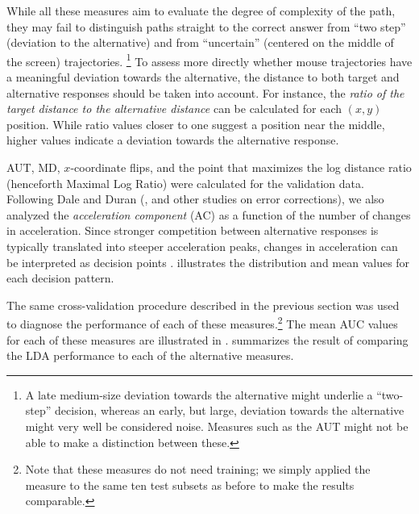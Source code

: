 \documentclass[11pt]{article}
\begin{document}
While all these measures aim to evaluate the degree of complexity of the path, they may fail to distinguish paths straight to the correct answer from ``two step'' (deviation to the alternative) and from ``uncertain'' (centered on the middle of the screen) trajectories.%
%
\footnote{A late medium-size deviation towards the alternative might underlie a ``two-step'' decision, whereas an early, but large, deviation towards the alternative might very well be considered noise. Measures such as the AUT might not be able to make a distinction between these.} 
To assess more directly whether mouse trajectories have a meaningful deviation towards the alternative, the distance to both target and alternative responses should be taken into account. 
For instance, the \textit{ratio of the target distance to the alternative distance} can be calculated for each $(x,y)$ position. While ratio values closer to one suggest a position near the middle, higher values indicate a deviation towards the alternative response. 

AUT, MD, $x$-coordinate flips, and the point that maximizes the log distance ratio (henceforth Maximal Log Ratio)  %
were calculated for the validation data. 
Following Dale and Duran (\citeyear{Dale2011}, and other studies on error corrections), we also analyzed the \emph{acceleration component} (AC) as a function of the number of changes in acceleration.
Since stronger competition between alternative responses is typically translated into steeper acceleration peaks, changes in acceleration can be interpreted as decision points \citep{Hehman2014}.   
 illustrates the distribution and mean values for each decision pattern.


The same cross-validation procedure described in the previous section was used to diagnose the performance of each of these measures.\footnote{Note that these measures do not need training; we simply applied the measure to the same ten test subsets as before to make the results comparable.} The mean AUC values for each of these measures are illustrated in .  summarizes the result of comparing the LDA performance to each of the alternative measures. 
\end{document}

